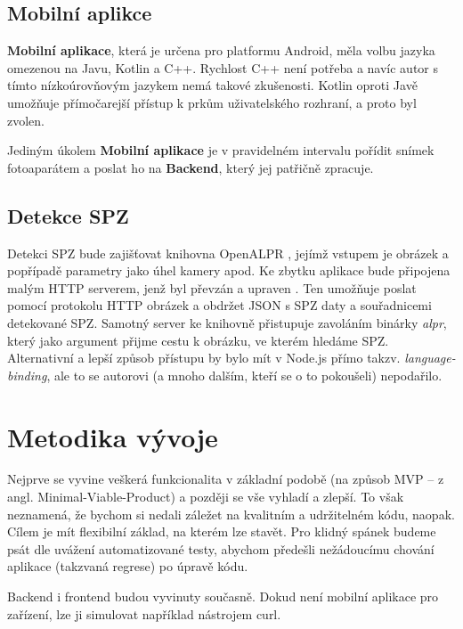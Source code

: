 \subsection{Mobilní aplikce} \label{mobile_app}

\textbf{Mobilní aplikace}, která je určena pro platformu Android, měla volbu jazyka omezenou na Javu, Kotlin a C++.
Rychlost C++ není potřeba a navíc autor s tímto nízkoúrovňovým jazykem nemá takové zkušenosti.
Kotlin oproti Javě umožňuje přímočarejší přístup k prkům uživatelského rozhraní, a proto byl zvolen.

Jediným úkolem \textbf{Mobilní aplikace} je v pravidelném intervalu pořídit snímek fotoaparátem a poslat ho na
\textbf{Backend}, který jej patřičně zpracuje.

\subsection{Detekce SPZ}

Detekci SPZ bude zajišťovat knihovna OpenALPR \citep[viz][]{OpenALPR}, jejímž vstupem je obrázek a popřípadě
parametry jako úhel kamery apod. Ke zbytku aplikace bude připojena malým HTTP serverem, jenž byl převzán a upraven
\citep[viz][]{OpenALPR_Server}.
Ten umožňuje poslat pomocí protokolu HTTP obrázek a obdržet JSON s SPZ daty a souřadnicemi detekované SPZ.
Samotný server ke knihovně přistupuje zavoláním binárky \textit{alpr}, který jako argument přijme cestu k
obrázku, ve kterém hledáme SPZ. Alternativní a lepší způsob přístupu by bylo mít v Node.js přímo takzv.
\textit{language-binding}, ale to se autorovi (a mnoho dalším, kteří se o to pokoušeli) nepodařilo.

\section{Metodika vývoje}

Nejprve se vyvine veškerá funkcionalita v základní podobě
(na způsob MVP -- z angl. Minimal-Viable-Product) a později se vše vyhladí a zlepší. To však neznamená,
že bychom si nedali záležet na kvalitním a udržitelném kódu, naopak. Cílem je mít flexibilní základ,
na kterém lze stavět. Pro klidný spánek budeme psát dle uvážení automatizované testy, abychom předešli
nežádoucímu chování aplikace (takzvaná regrese) po úpravě kódu.

Backend i frontend budou vyvinuty současně. Dokud není mobilní aplikace pro zařízení, lze ji simulovat
například nástrojem curl.
